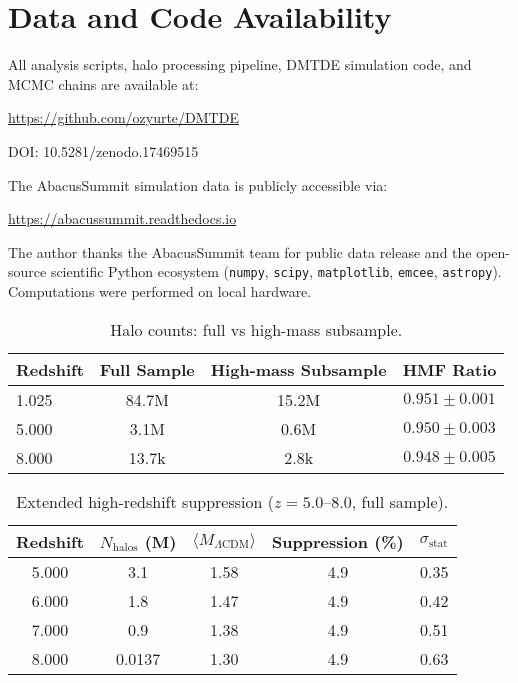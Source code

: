 \documentclass[aps,prd,twocolumn,superscriptaddress,nofootinbib,floatfix,preprintnumbers]{revtex4-2}
\begin{document}
\section{Data and Code Availability}
\label{sec:reproducibility}

All analysis scripts, halo processing pipeline, DMTDE simulation code, and MCMC chains are available at:
\begin{center}
\url{https://github.com/ozyurte/DMTDE}
\end{center}
DOI: 10.5281/zenodo.17469515

The AbacusSummit simulation data is publicly accessible via:
\begin{center}
\url{https://abacussummit.readthedocs.io}
\end{center}

\begin{acknowledgments}
The author thanks the AbacusSummit team for public data release and the open-source scientific Python ecosystem (\texttt{numpy}, \texttt{scipy}, \texttt{matplotlib}, \texttt{emcee}, \texttt{astropy}). Computations were performed on local hardware.
\end{acknowledgments}


\begin{table}[!htbp]
\caption{Halo counts: full vs high-mass subsample.}
\label{tab:halo_counts}
\centering
\begin{tabular}{lccc}
\toprule
Redshift & Full Sample & High-mass Subsample & HMF Ratio \\
\midrule
1.025 & 84.7M & 15.2M & $0.951 \pm 0.001$ \\
5.000 & 3.1M  & 0.6M  & $0.950 \pm 0.003$ \\
8.000 & 13.7k & 2.8k  & $0.948 \pm 0.005$ \\
\bottomrule
\end{tabular}
\end{table}

\begin{table}[!htbp]
\caption{Extended high-redshift suppression ($z=5.0$--$8.0$, full sample).}
\label{tab:highz_suppression}
\centering
\begin{tabular}{ccccc}
\toprule
Redshift & $N_{\mathrm{halos}}$ (M) & $\langle M_{\Lambda\mathrm{CDM}} \rangle$ & Suppression (\%) & $\sigma_{\mathrm{stat}}$ \\
\midrule
5.000 & 3.1 & 1.58 & 4.9 & 0.35 \\
6.000 & 1.8 & 1.47 & 4.9 & 0.42 \\
7.000 & 0.9 & 1.38 & 4.9 & 0.51 \\
8.000 & 0.0137 & 1.30 & 4.9 & 0.63 \\
\bottomrule
\end{tabular}
\end{table}
\end{document}
